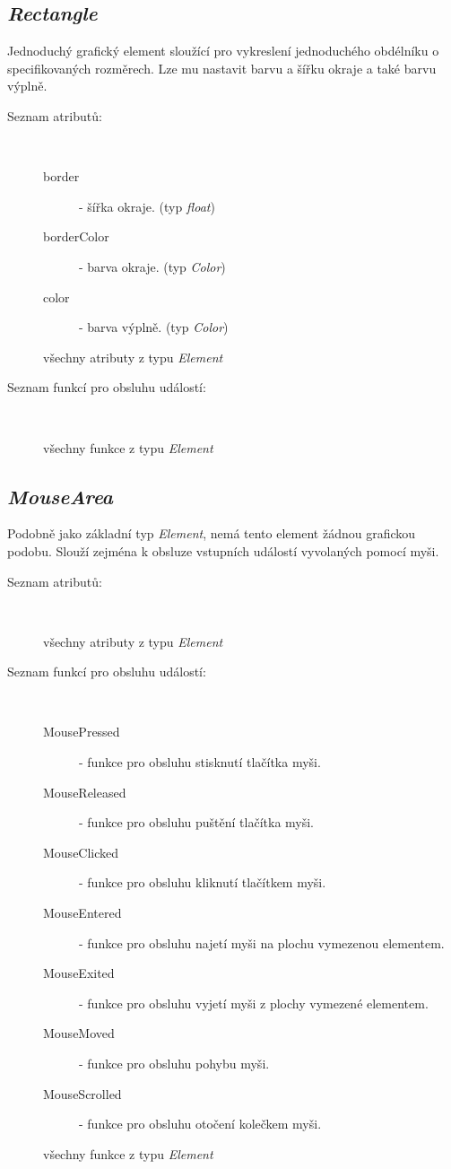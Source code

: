 \documentclass[11pt,twoside,a4paper]{book}
\begin{document}
\subsection{\textit{Rectangle}}
Jednoduchý grafický element sloužící pro vykreslení jednoduchého obdélníku o specifikovaných rozměrech. Lze mu nastavit barvu a šířku okraje a také barvu výplně.\\
\begin{description}
\item[Seznam atributů:] ~
\begin{description}
\item[border] - šířka okraje. (typ \textit{float})
\item[borderColor] - barva okraje. (typ \textit{Color})
\item[color] - barva výplně. (typ \textit{Color})
\item[všechny atributy z typu \textit{Element}]
\end{description}
\item[Seznam funkcí pro obsluhu událostí:] ~
\begin{description}
\item[všechny funkce z typu \textit{Element}]
\end{description}
\end{description}

\subsection{\textit{MouseArea}}
Podobně jako základní typ \textit{Element}, nemá tento element žádnou grafickou podobu. Slouží zejména k obsluze vstupních událostí vyvolaných pomocí myši.\\
\begin{description}
\item[Seznam atributů:] ~
\begin{description}
\item[všechny atributy z typu \textit{Element}]
\end{description}
\item[Seznam funkcí pro obsluhu událostí:] ~
\begin{description}
\item[MousePressed] - funkce pro obsluhu stisknutí tlačítka myši.
\item[MouseReleased] - funkce pro obsluhu puštění tlačítka myši.
\item[MouseClicked] - funkce pro obsluhu kliknutí tlačítkem myši.
\item[MouseEntered] - funkce pro obsluhu najetí myši na plochu vymezenou elementem.
\item[MouseExited] - funkce pro obsluhu vyjetí myši z plochy vymezené elementem.
\item[MouseMoved] - funkce pro obsluhu pohybu myši.
\item[MouseScrolled] - funkce pro obsluhu otočení kolečkem myši.
\item[všechny funkce z typu \textit{Element}]
\end{description}
\end{description}
\end{document}
